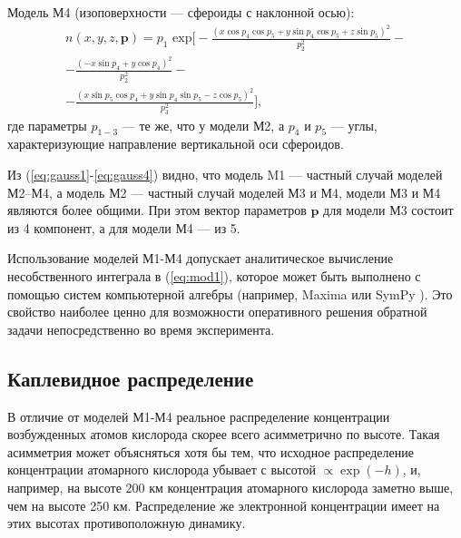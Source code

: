 \documentclass[12pt,a4paper]{article}
\renewcommand{\vec}{\mathbf}
\begin{document}
Модель М4 (изоповерхности --- сфероиды с наклонной осью):
\begin{equation}\label{eq:gauss4}
\begin{split}
n(x,y,z,\vec{p})=p_1 \text{ exp} \bigg[ 
-\frac{(x\cos{p_4}\cos{p_5} + y\sin{p_4}\cos{p_5} + z\sin{p_5})^2}{p_2^2}-\\
-\frac{(-x\sin{p_4} + y\cos{p_4})^2}{p_2^2} -\\ 
-\frac{(x\sin{p_5}\cos{p_4} + y\sin{p_4}\sin{p_5} - z\cos{p_5})^2}{p_3^2}\bigg],
\end{split}
\end{equation}
где параметры $p_{1-3}$ --- те же, что у модели М2, а $p_4$ и $p_5$ --- углы, характеризующие направление вертикальной оси сфероидов.

Из (\ref{eq:gauss1}-\ref{eq:gauss4}) видно, что модель M1 --- частный случай моделей М2--М4, а модель М2 --- частный случай моделей М3 и М4, модели М3 и М4 являются более общими. При этом вектор параметров $\vec{p}$ для модели М3 состоит из 4 компонент, а для модели М4 --- из 5.

Использование моделей М1-М4 допускает аналитическое вычисление несобственного интеграла в (\ref{eq:mod1}), которое может быть выполнено с помощью систем компьютерной алгебры (например, Maxima \cite{Maxima} или SymPy \cite{SymPy}). Это свойство наиболее ценно для возможности оперативного решения обратной задачи непосредственно во время эксперимента. 

\subsection{Каплевидное распределение} \label{subsec:model2}
В отличие от моделей М1-М4 реальное распределение концентрации возбужденных атомов кислорода скорее всего асимметрично по высоте. Такая асимметрия может объясняться хотя бы тем, что исходное распределение концентрации атомарного кислорода убывает с высотой $\propto \exp {(-h)}$, и, например, на высоте 200 км концентрация атомарного кислорода заметно выше, чем на высоте 250 км. Распределение же электронной концентрации имеет на этих высотах противоположную динамику.
\end{document}
